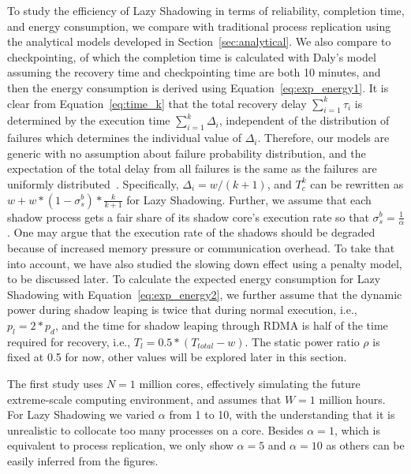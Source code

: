 To study the efficiency of Lazy Shadowing in terms of reliability, completion time, and energy consumption, we compare with traditional process replication using the analytical models developed in Section~\ref{sec:analytical}. We also compare to checkpointing, of which the completion time is calculated with Daly's model~\cite{daly_fgcs_2006} assuming the recovery time and checkpointing time are both 10 minutes, and then the energy consumption is derived using Equation~\ref{eq:exp_energy1}. 
It is clear from Equation~\ref{eq:time_k} that the total recovery delay $\sum_{i=1}^k\tau_i$ is determined by the execution time $\sum_{i=1}^k\Delta_i$, independent of the distribution of failures which determines 
the individual value of $\Delta_i$. 
Therefore, our models are generic with no assumption about failure probability distribution, and the expectation of the total delay from all failures is the same as the failures are uniformly distributed~\cite{daly_fgcs_2006}. Specifically, $\Delta_i = w/(k+1)$, and $T_c^k$ can be rewritten as $w + w*(1-\sigma_s^b)*\frac{k}{k+1}$ for Lazy Shadowing. Further, we assume that each shadow process gets a fair share of its shadow core's execution rate so that $\sigma_s^b = \frac{1}{\alpha}$. One may argue that the execution rate of the shadows
should be degraded because of increased memory pressure or communication overhead. %
To take that into account, we have also studied the slowing down effect using a penalty model, to be discussed later. 
To calculate the expected energy consumption for Lazy Shadowing with Equation~\ref{eq:exp_energy2}, we further assume that the dynamic power during shadow leaping is twice that during normal execution, i.e., $p_{l}=2*p_d$, and the time for shadow leaping through RDMA is half of the time required for recovery, i.e., $T_l=0.5*(T_{total} - w)$. The static power ratio $\rho$ is fixed at 0.5 for now, other values will be explored later in this section.

The first study uses $N=1$ million cores, effectively simulating the future extreme-scale computing environment, and assumes that $W=1$ million hours. 
For Lazy Shadowing we varied $\alpha$ from 1 to 10, with the understanding that it is unrealistic to collocate too many processes on a core. Besides $\alpha=1$, which is equivalent to process replication, we only show $\alpha=5$ and $\alpha=10$ as others can be easily inferred from the figures.

